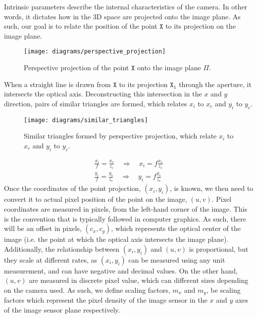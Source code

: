 Intrinsic parameters describe the internal characteristics of the camera. In other words, it dictates how in the 3D space are projected onto the image plane. As such, our goal is to relate the position of the point $\mathtt{X}$ to its projection on the image plane.

\begin{figure}[H]
    \centering
    \texttt{[image: diagrams/perspective\_projection]}
    \caption{Perspective projection of the point $\mathtt{X}$ onto the image plane $\Pi$.}
\end{figure}
When a straight line is drawn from $\mathtt{X}$ to its projection $\mathtt{X_i}$ through the aperture, it intersects the optical axis. Deconstructing this intersection in the $x$ and $y$ direction, pairs of similar triangles are formed, which relates $x_i$ to $x_c$ and $y_i$ to $y_c$.
\begin{figure}[H]
    \centering
    \texttt{[image: diagrams/similar\_triangles]}
    \caption{Similar triangles formed by perspective projection, which relate $x_i$ to $x_c$ and $y_i$ to $y_c$.} \label{fig:similar_triangles}
\end{figure}
\begin{subequations}
    \begin{gather}
        \frac{x_i}{f} = \frac{x_c}{z_c} \quad \Longrightarrow \quad x_i = f \frac{x_c}{z_c} \label{subeq:xi_result}\\
        \frac{y_i}{f} = \frac{y_c}{z_c} \quad \Longrightarrow \quad y_i = f \frac{y_c}{z_c} \label{subeq:yi_result}
    \end{gather}
\end{subequations}
Once the coordinates of the point projection, $(x_i, y_i)$, is known, we then need to convert it to actual pixel position of the point on the image, $(u, v)$. Pixel coordinates are measured in pixels, from the left-hand corner of the image. This is the convention that is typically followed in computer graphics. As such, there will be an offset in pixels, $(c_x, c_y)$, which represents the optical center of the image (i.e. the point at which the optical axis intersects the image plane). Additionally, the relationship between $(x_i, y_i)$ and $(u, v)$ is proportional, but they scale at different rates, as $(x_i, y_i)$ can be measured using any unit measurement, and can have negative and decimal values. On the other hand, $(u,v)$ are measured in discrete pixel value, which can different sizes depending on the camera used. As such, we define scaling factors, $m_x$ and $m_y$, be scaling factors which represent the pixel density of the image sensor in the $x$ and $y$ axes of the image sensor plane respectively.
